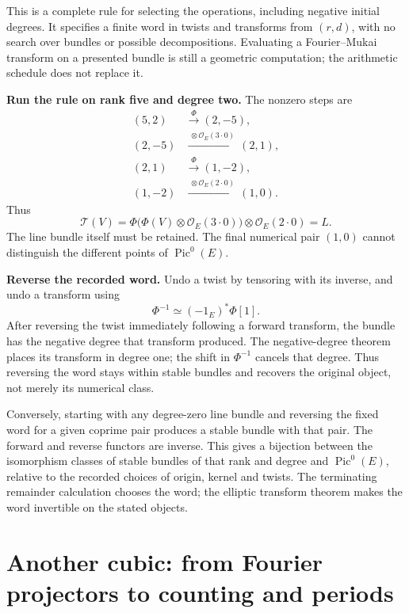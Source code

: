 \documentclass[11pt]{article}
\theoremstyle{remark}
\begin{document}
This is a complete rule for selecting the operations, including negative initial degrees. It specifies a finite word in twists and transforms from \((r,d)\), with no search over bundles or possible decompositions. Evaluating a Fourier--Mukai transform on a presented bundle is still a geometric computation; the arithmetic schedule does not replace it.

\textbf{Run the rule on rank five and degree two.}
The nonzero steps are
\[
\begin{aligned}
(5,2)&\xrightarrow{\ \Phi\ }(2,-5),\\
(2,-5)&\xrightarrow{\ \otimes\mathcal O_E(3\cdot0)\ }(2,1),\\
(2,1)&\xrightarrow{\ \Phi\ }(1,-2),\\
(1,-2)&\xrightarrow{\ \otimes\mathcal O_E(2\cdot0)\ }(1,0).
\end{aligned}
\]
Thus
\[
\mathcal T(V)=
\Phi\bigl(\Phi(V)\otimes\mathcal O_E(3\cdot0)\bigr)
\otimes\mathcal O_E(2\cdot0)=L.
\]
The line bundle itself must be retained. The final numerical pair \((1,0)\) cannot distinguish the different points of \(\operatorname{Pic}^0(E)\).

\textbf{Reverse the recorded word.}
Undo a twist by tensoring with its inverse, and undo a transform using
\[
\Phi^{-1}\simeq(-1_E)^*\Phi[1].
\]
After reversing the twist immediately following a forward transform, the bundle has the negative degree that transform produced. The negative-degree theorem places its transform in degree one; the shift in \(\Phi^{-1}\) cancels that degree. Thus reversing the word stays within stable bundles and recovers the original object, not merely its numerical class.

Conversely, starting with any degree-zero line bundle and reversing the fixed word for a given coprime pair produces a stable bundle with that pair. The forward and reverse functors are inverse. This gives a bijection between the isomorphism classes of stable bundles of that rank and degree and \(\operatorname{Pic}^0(E)\), relative to the recorded choices of origin, kernel and twists. The terminating remainder calculation chooses the word; the elliptic transform theorem makes the word invertible on the stated objects.

\section{Another cubic: from Fourier projectors to counting and periods}
\label{fermat:section}
\end{document}
